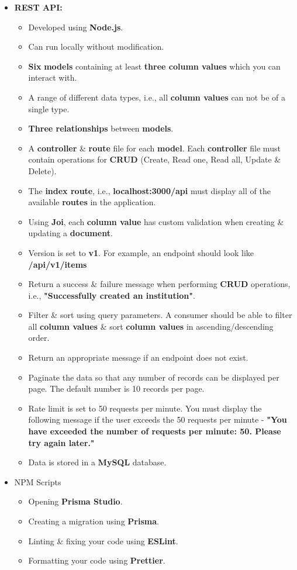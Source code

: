 \documentclass{article}
\begin{document}
\begin{itemize} 
	\item \textbf{REST API:}
	\begin{itemize}
	\item Developed using \textbf{Node.js}.
	\item Can run locally without modification.
	\item \textbf{Six} \textbf{models} containing at least \textbf{three column values} which you can interact with.
	\item A range of different data types, i.e., all \textbf{column values} can not be of a single type.
	\item \textbf{Three relationships} between \textbf{models}.
	\item A \textbf{controller} \& \textbf{route} file for each \textbf{model}. Each \textbf{controller} file must contain operations for \textbf{CRUD} (Create, Read one, Read all, Update \& Delete).
	\item The \textbf{index route}, i.e., \textbf{localhost:3000/api} must display all of the available \textbf{routes} in the application.
	\item Using \textbf{Joi}, each \textbf{column value} has custom validation when creating \& updating a \textbf{document}.
	\item Version is set to \textbf{v1}. For example, an endpoint should look like \textbf{/api/v1/items}
	\item Return a success \& failure message when performing \textbf{CRUD} operations, i.e., \textbf{"Successfully created an institution"}.
	\item Filter \& sort using query parameters. A consumer should be able to filter all \textbf{column values} \& sort \textbf{column values} in ascending/descending order.
	\item Return an appropriate message if an endpoint does not exist.
	\item Paginate the data so that any number of records can be displayed per page. The default number is 10 records per page. 
	\item Rate limit is set to 50 requests per minute. You must display the following message if the user exceeds the 50 requests per minute - \textbf{"You have exceeded the number of requests per minute: 50. Please try again later."}
	\item Data is stored in a \textbf{MySQL} database.
\end{itemize}
\item NPM Scripts
\begin{itemize}
	\item Opening \textbf{Prisma Studio}.
	\item Creating a migration using \textbf{Prisma}. 
	\item Linting \& fixing your code using \textbf{ESLint}.
	\item Formatting your code using \textbf{Prettier}.
\end{itemize}
\end{itemize}
\end{document}
